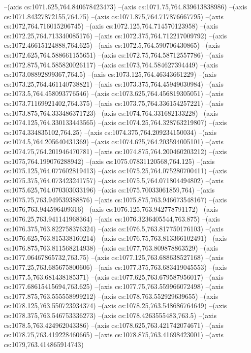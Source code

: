 --(axis cs:1071.625,764.840678423473)
--(axis cs:1071.75,764.839613838986)
--(axis cs:1071.84327872155,764.75)
--(axis cs:1071.875,764.717876667795)
--(axis cs:1072,764.716015206745)
--(axis cs:1072.125,764.714570123958)
--(axis cs:1072.25,764.713340085176)
--(axis cs:1072.375,764.712217009792)
--(axis cs:1072.46615124888,764.625)
--(axis cs:1072.5,764.590706430865)
--(axis cs:1072.625,764.588661155651)
--(axis cs:1072.75,764.58712557786)
--(axis cs:1072.875,764.585820026117)
--(axis cs:1073,764.584627394449)
--(axis cs:1073.08892899367,764.5)
--(axis cs:1073.125,764.46343661229)
--(axis cs:1073.25,764.461140738821)
--(axis cs:1073.375,764.45949030984)
--(axis cs:1073.5,764.458093776546)
--(axis cs:1073.625,764.456819305051)
--(axis cs:1073.71169921402,764.375)
--(axis cs:1073.75,764.336154257221)
--(axis cs:1073.875,764.333486371723)
--(axis cs:1074,764.331682133228)
--(axis cs:1074.125,764.330133443565)
--(axis cs:1074.25,764.328763219807)
--(axis cs:1074.334835102,764.25)
--(axis cs:1074.375,764.209234150034)
--(axis cs:1074.5,764.205640431369)
--(axis cs:1074.625,764.203594005101)
--(axis cs:1074.75,764.201946470781)
--(axis cs:1074.875,764.200460203212)
--(axis cs:1075,764.199076288942)
--(axis cs:1075.07831120568,764.125)
--(axis cs:1075.125,764.077602819413)
--(axis cs:1075.25,764.075280700411)
--(axis cs:1075.375,764.073423241757)
--(axis cs:1075.5,764.071804494802)
--(axis cs:1075.625,764.070303033196)
--(axis cs:1075.70033061859,764)
--(axis cs:1075.75,763.949539388876)
--(axis cs:1075.875,763.946673548167)
--(axis cs:1076,763.944596409316)
--(axis cs:1076.125,763.942778791172)
--(axis cs:1076.25,763.941141968364)
--(axis cs:1076.3236405544,763.875)
--(axis cs:1076.375,763.822758376324)
--(axis cs:1076.5,763.817750176103)
--(axis cs:1076.625,763.815338160214)
--(axis cs:1076.75,763.813366102491)
--(axis cs:1076.875,763.811568214938)
--(axis cs:1077,763.809878863529)
--(axis cs:1077.06467865732,763.75)
--(axis cs:1077.125,763.688638527168)
--(axis cs:1077.25,763.685675800606)
--(axis cs:1077.375,763.683419045553)
--(axis cs:1077.5,763.681438185371)
--(axis cs:1077.625,763.679587956017)
--(axis cs:1077.68615415694,763.625)
--(axis cs:1077.75,763.559966072498)
--(axis cs:1077.875,763.555558999212)
--(axis cs:1078,763.552929639655)
--(axis cs:1078.125,763.550723934374)
--(axis cs:1078.25,763.548686764649)
--(axis cs:1078.375,763.546753336273)
--(axis cs:1078.4263555483,763.5)
--(axis cs:1078.5,763.424962043386)
--(axis cs:1078.625,763.421742074671)
--(axis cs:1078.75,763.419228460665)
--(axis cs:1078.875,763.41698423001)
--(axis cs:1079,763.414865914743)
